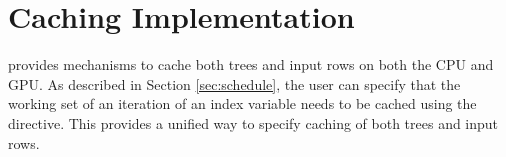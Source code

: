 \section{Caching Implementation}
\label{sec:caching}


\Treebeard{} provides mechanisms to cache both trees and input rows 
on both the CPU and GPU. As described in Section \ref{sec:schedule}, 
the user can specify that the working set of an iteration of an index
variable needs to be cached using the  directive. This 
provides a unified way to specify caching of both trees and input rows.

